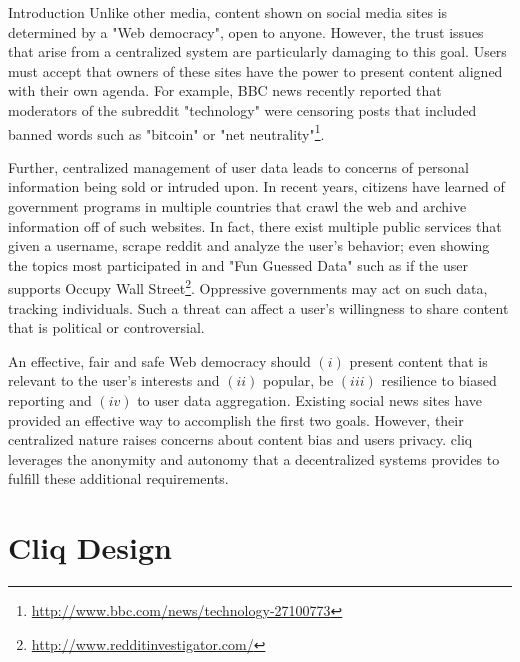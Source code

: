\documentclass{sig-alternate}
\begin{document}
\begin{section}{Introduction}
Unlike other media, content shown on social media sites is determined by a "Web democracy", 
open to anyone. However, the trust issues that arise from a centralized system are particularly 
damaging to this goal. Users must accept that owners of these sites have the power to present 
content aligned with their own agenda. For example, BBC news recently reported that moderators 
of the subreddit "technology" were censoring posts that included banned words such as "bitcoin" 
or "net neutrality"\footnote{\url{http://www.bbc.com/news/technology-27100773}}.

Further, centralized management of user data leads to concerns of personal information being 
sold or intruded upon. In recent years, citizens have learned of government programs in multiple 
countries that crawl the web and archive information off of such websites. In fact, there exist 
multiple public services that given a username, scrape reddit and analyze the user's behavior; even 
showing the topics most participated in and "Fun Guessed Data" such as if the user supports
Occupy Wall Street\footnote{\url{http://www.redditinvestigator.com/}}. Oppressive governments may 
act on such data, tracking individuals. Such a threat can affect a user's willingness to share content 
that is political or controversial. 

An effective, fair and safe Web democracy should $(i)$ present content that is relevant to the user's 
interests and $(ii)$ popular, be $(iii)$ resilience to biased reporting and $(iv)$ to user data 
aggregation. Existing social news sites have provided an effective way to accomplish the first two 
goals. However, their centralized nature raises concerns about content bias and users privacy. 
cliq leverages the anonymity and autonomy that a decentralized systems provides to fulfill these 
additional requirements.
\end{section}

\section{Cliq Design}
\end{document}
